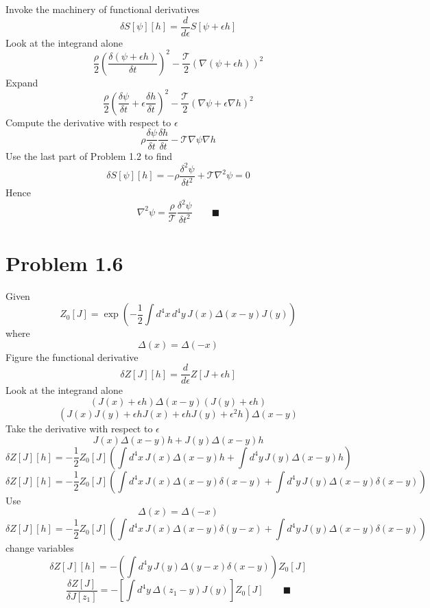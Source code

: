 \documentclass{amsart}
\begin{document}
Invoke the machinery of functional derivatives
\[\delta S[\psi][h]=\frac{d}{d\epsilon}S[\psi+\epsilon h]\]
Look at the integrand alone
\[\frac{\rho}{2}\left(\frac{\delta (\psi+\epsilon h)}{\delta t}\right)^2 - \frac{\mathcal{T}}{2}\left(\nabla(\psi+\epsilon h)\right)^2\]
Expand
\[\frac{\rho}{2}\left(\frac{\delta \psi}{\delta t}+\epsilon \frac{\delta h}{\delta t}\right)^2 - \frac{\mathcal{T}}{2}\left(\nabla \psi+\epsilon \nabla h\right)^2\]
Compute the derivative with respect to $\epsilon$
\[\rho\frac{\delta \psi}{\delta t}\frac{\delta h}{\delta t} - \mathcal{T}\nabla \psi \nabla h\]
Use the last part of Problem 1.2 to find
\[\delta S[\psi][h]=-\rho\frac{\delta^2 \psi}{\delta t^2} + \mathcal{T}\nabla^2 \psi =0\]
Hence
\[\nabla^2 \psi=\frac{\rho}{\mathcal{T}}\frac{\delta^2 \psi}{\delta t^2} \qquad \blacksquare\]

\section*{Problem 1.6}
Given \[Z_0[J]=\exp\left(-\frac{1}{2}\int d^4 x\, d^4 y\, J(x) \Delta(x-y) J(y)\right)\]
where \[\Delta(x)=\Delta(-x)\]
Figure the functional derivative
\[\delta Z[J][h]=\frac{d}{d\epsilon}Z[J+\epsilon h]\]
Look at the integrand alone
\[(J(x)+\epsilon h) \Delta(x-y) (J(y)+\epsilon h)\]
\[(J(x)J(y)+\epsilon h J(x)+\epsilon h J(y)+\epsilon^2 h) \Delta(x-y)\]
Take the derivative with respect to $\epsilon$
\[J(x) \Delta(x-y)h + J(y) \Delta(x-y)h\]
\[\delta Z[J][h]=-\frac{1}{2}Z_0[J]\left(\int d^4 x\,  J(x) \Delta(x-y)h +\int d^4 y\,J(y) \Delta(x-y)h\right)\]
\[\delta Z[J][h]=-\frac{1}{2}Z_0[J]\left(\int d^4 x\,  J(x) \Delta(x-y)\delta(x-y) +\int d^4 y\,J(y) \Delta(x-y)\delta(x-y)\right)\]
Use \[\Delta(x)=\Delta(-x)\]
\[\delta Z[J][h]=-\frac{1}{2}Z_0[J]\left(\int d^4 x\,  J(x) \Delta(x-y)\delta(y-x) +\int d^4 y\,J(y) \Delta(x-y)\delta(x-y)\right)\] change variables
\[\delta Z[J][h]=-\left(\int d^4 y\,J(y) \Delta(y-x)\delta(x-y)\right)Z_0[J]\]
\[\frac{\delta Z[J]}{\delta J[z_1]}=-\left[\int d^4 y\, \Delta(z_1-y)J(y)\right]Z_0[J] \qquad \blacksquare\]
\end{document}
